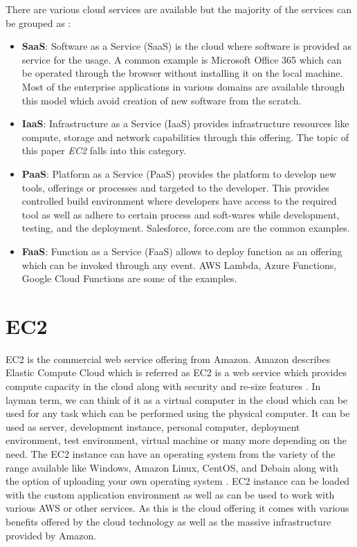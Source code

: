 There are various cloud services are available but the majority of the services can be grouped as \cite{www-infoworld}: 
\begin{itemize}
\item {\bf SaaS}: Software as a Service (SaaS) is the cloud where software is provided as service for the usage. A common example is Microsoft Office 365 which can be operated through the browser without installing it on the local machine. Most of the enterprise applications in various domains are available through this model which avoid creation of new software from the scratch.
\item {\bf IaaS}: Infrastructure as a Service (IaaS) provides infrastructure resources like compute, storage and network capabilities through this offering. The topic of this paper \emph{EC2} falls into this category.
\item {\bf PaaS}: Platform as a Service (PaaS) provides the platform to develop new tools, offerings or processes and targeted to the developer. This provides controlled build environment where developers have access to the required tool as well as adhere to certain process and soft-wares while development, testing, and the deployment. Salesforce, force.com are the common examples.
\item {\bf FaaS}: Function as a Service (FaaS) allows to deploy function as an offering which can be invoked through any event. AWS Lambda, Azure Functions, Google Cloud Functions are some of the examples.
\end{itemize}

\section{EC2}
EC2 is the commercial web service offering from Amazon. Amazon describes Elastic Compute Cloud which is referred as EC2 is a web service which provides compute capacity in the cloud along with security and re-size features \cite{www-aws-ec2}. In layman term, we can think of it as a virtual computer in the cloud which can be used for any task which can be performed using the physical computer. It can be used as server, development instance, personal computer, deployment environment, test environment, virtual machine or many more depending on the need. The EC2 instance can have an operating system from the variety of the range available like Windows, Amazon Linux, CentOS, and Debain along with the option of uploading your own operating system \cite{www-aws-ec2-details}. EC2 instance can be loaded with the custom application environment as well as can be used to work with various AWS or other services. As this is the cloud offering it comes with various benefits offered by the cloud technology as well as the massive infrastructure provided by Amazon.

